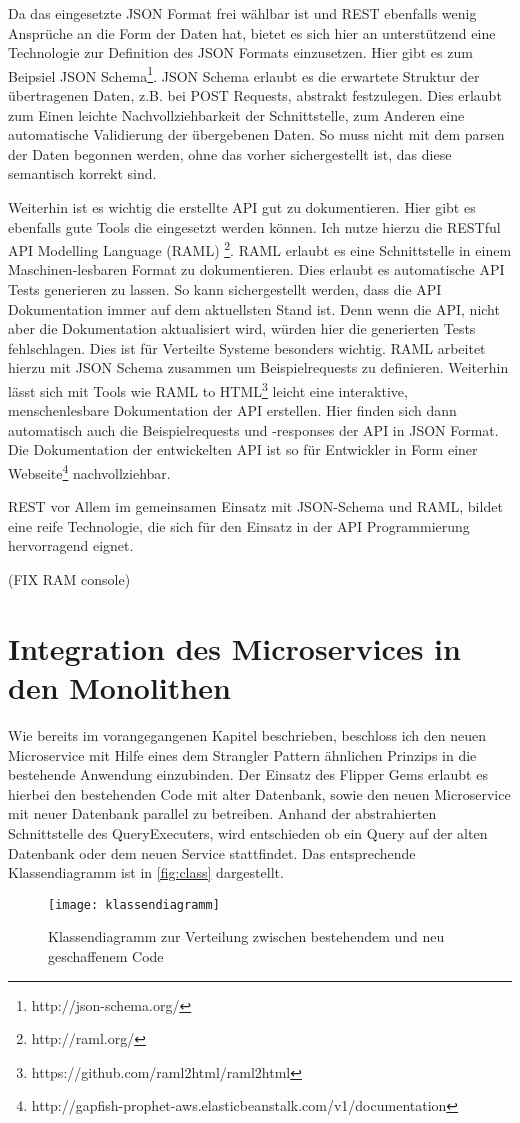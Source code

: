Da das eingesetzte JSON Format frei wählbar ist und REST ebenfalls wenig Ansprüche an die Form der Daten hat, bietet es sich hier an unterstützend eine Technologie zur Definition des JSON Formats einzusetzen. Hier gibt es zum Beipsiel JSON Schema\footnote{http://json-schema.org/}. JSON Schema erlaubt es die erwartete Struktur der übertragenen Daten, z.B. bei POST Requests, abstrakt festzulegen. Dies erlaubt zum Einen leichte Nachvollziehbarkeit der Schnittstelle, zum Anderen eine automatische Validierung der übergebenen Daten. So muss nicht mit dem parsen der Daten begonnen werden, ohne das vorher sichergestellt ist, das diese semantisch korrekt sind.

Weiterhin ist es wichtig die erstellte API gut zu dokumentieren. Hier gibt es ebenfalls gute Tools die eingesetzt werden können. Ich nutze hierzu die RESTful API Modelling Language (RAML) \footnote{http://raml.org/}. RAML erlaubt es eine Schnittstelle in einem Maschinen-lesbaren Format zu dokumentieren. Dies erlaubt es automatische API Tests generieren zu lassen. So kann sichergestellt werden, dass die API Dokumentation immer auf dem aktuellsten Stand ist. Denn wenn die API, nicht aber die Dokumentation aktualisiert wird, würden hier die generierten Tests fehlschlagen. Dies ist für Verteilte Systeme besonders wichtig. RAML arbeitet hierzu mit JSON Schema zusammen um Beispielrequests zu definieren. Weiterhin lässt sich mit Tools wie RAML to HTML\footnote{https://github.com/raml2html/raml2html} leicht eine interaktive, menschenlesbare Dokumentation der API erstellen. Hier finden sich dann automatisch auch die Beispielrequests und -responses der API in JSON Format. Die Dokumentation der entwickelten API ist so für Entwickler in Form einer Webseite\footnote{http://gapfish-prophet-aws.elasticbeanstalk.com/v1/documentation} nachvollziehbar. 

REST vor Allem im gemeinsamen Einsatz mit JSON-Schema und RAML, bildet eine reife Technologie, die sich für den Einsatz in der API Programmierung hervorragend eignet.

(FIX RAM console)

\section{Integration des Microservices in den Monolithen}
Wie bereits im vorangegangenen Kapitel beschrieben, beschloss ich den neuen Microservice mit Hilfe eines dem Strangler Pattern ähnlichen Prinzips in die bestehende Anwendung einzubinden.
Der Einsatz des Flipper Gems erlaubt es hierbei den bestehenden Code mit alter Datenbank, sowie den neuen Microservice mit neuer Datenbank parallel zu betreiben. Anhand der abstrahierten Schnittstelle des QueryExecuters, wird entschieden ob ein Query auf der alten Datenbank oder dem neuen Service stattfindet. Das entsprechende Klassendiagramm ist in \autoref{fig:class} dargestellt.
\begin{figure}[!ht]
    \centering
    \caption{Klassendiagramm zur Verteilung zwischen bestehendem und neu geschaffenem Code}
    \label{fig:class}
    \texttt{[image: klassendiagramm]}
\end{figure}

